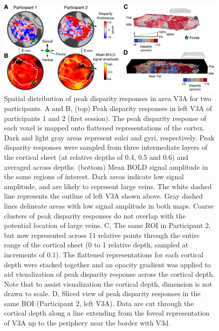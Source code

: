 \begin{figure}
  \centering
  \includegraphics[width=14cm, keepaspectratio]{fig2}
  \caption[Spatial distribution of peak disparity responses in area V3A.]{Spatial distribution of peak disparity responses in area V3A for two participants. A and B, (top) Peak disparity responses in left V3A of participants 1 and 2 (first session). The peak disparity response of each voxel is mapped onto flattened representations of the cortex. Dark and light gray areas represent sulci and gyri, respectively. Peak disparity responses were sampled from three intermediate layers of the cortical sheet (at relative depths of 0.4, 0.5 and 0.6) and averaged across depths. (bottom) Mean BOLD signal amplitude in the same regions of interest. Dark areas indicate low signal amplitude, and are likely to represent large veins. The white dashed line represents the outline of left V3A shown above. Gray dashed lines delineate areas with low signal amplitude in both maps. Coarse clusters of peak disparity responses do not overlap with the potential location of large veins. C, The same ROI in Participant 2, but now represented across 11 relative points through the entire range of the cortical sheet (0 to 1 relative depth, sampled at increments of 0.1). The flattened representations for each cortical depth were stacked together and an opacity gradient was applied to aid visualization of peak disparity response across the cortical depth. Note that to assist visualization the cortical depth, dimension is not drawn to scale. D, Sliced view of peak disparity responses in the same ROI (Participant 2, left V3A). Data are cut through the cortical depth along a line extending from the foveal representation of V3A up to the periphery near the border with V3d.}
  \label{fig:ch4fig2}
\end{figure}

